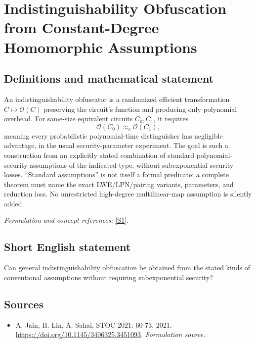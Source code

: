 \documentclass[11pt]{article}
\begin{document}
\section*{\texorpdfstring{Indistinguishability Obfuscation from Constant-Degree Homomorphic Assumptions}{Indistinguishability Obfuscation from Constant-Degree Homomorphic Assumptions}}\label{30006749}
\subsection{Definitions and mathematical statement}
An indistinguishability obfuscator is a randomized efficient transformation $C\mapsto\mathcal O(C)$ preserving the circuit's function and producing only polynomial overhead. For same-size equivalent circuits $C_0,C_1$, it requires
\[
 \mathcal O(C_0)\approx_c\mathcal O(C_1),
\]
meaning every probabilistic polynomial-time distinguisher has negligible advantage, in the usual security-parameter experiment. The goal is such a construction from an explicitly stated combination of standard polynomial-security assumptions of the indicated type, without subexponential security losses. ``Standard assumptions'' is not itself a formal predicate: a complete theorem must name the exact LWE/LPN/pairing variants, parameters, and reduction loss. No unrestricted high-degree multilinear-map assumption is silently added.
\par\smallskip\textit{Formulation and concept references:} \href{https://doi.org/10.1145/3406325.3451093}{[S1]}.

\subsection{Short English statement}
Can general indistinguishability obfuscation be obtained from the stated kinds of conventional assumptions without requiring subexponential security?
\subsection{Sources}
\begin{itemize}
\item[S1]A. Jain, H. Lin, A. Sahai, STOC 2021: 60-73, 2021.
\url{https://doi.org/10.1145/3406325.3451093}.
\textit{Formulation source.}
\end{itemize}
\end{document}
